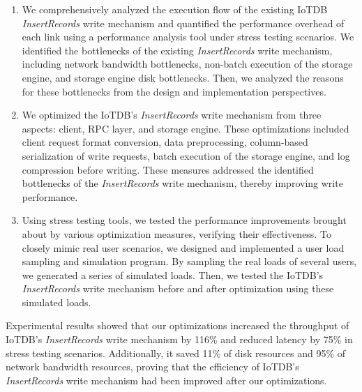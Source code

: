 \begin{abstract*}
  \begin{enumerate}
  \item We comprehensively analyzed the execution flow of the existing IoTDB \emph{InsertRecords} write mechanism and quantified the performance overhead of each link using a performance analysis tool under stress testing scenarios. We identified the bottlenecks of the existing \emph{InsertRecords} write mechanism, including network bandwidth bottlenecks, non-batch execution of the storage engine, and storage engine disk bottlenecks. Then, we analyzed the reasons for these bottlenecks from the design and implementation perspectives.
  \item We optimized the IoTDB's \emph{InsertRecords} write mechanism from three aspects: client, RPC layer, and storage engine. These optimizations included client request format conversion, data preprocessing, column-based serialization of write requests, batch execution of the storage engine, and log compression before writing. These measures addressed the identified bottlenecks of the \emph{InsertRecords} write mechanism, thereby improving write performance.
  \item Using stress testing tools, we tested the performance improvements brought about by various optimization measures, verifying their effectiveness. To closely mimic real user scenarios, we designed and implemented a user load sampling and simulation program. By sampling the real loads of several users, we generated a series of simulated loads. Then, we tested the IoTDB's \emph{InsertRecords} write mechanism before and after optimization using these simulated loads.
  \end{enumerate}
  
  Experimental results showed that our optimizations increased the throughput of IoTDB's \emph{InsertRecords} write mechanism by 116\% and reduced latency by 75\% in stress testing scenarios. Additionally, it saved 11\% of disk resources and 95\% of network bandwidth resources, proving that the efficiency of IoTDB's \emph{InsertRecords} write mechanism had been improved after our optimizations.
\end{abstract*}
